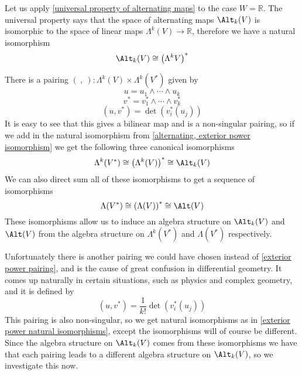 Let us apply \cref{universal property of alternating maps} to the case $W = \mathbb R$. The universal property says that the space of alternating maps $\Alt_k(V)$ is isomorphic to the space of linear maps $\Lambda^k(V) \rightarrow \mathbb R$, therefore we have a natural isomorphism
\begin{equation}
\label{alternating, exterior power isomorphism}
\Alt_k(V) \cong \left( \Lambda^k V \right)^*
\end{equation}

There is a pairing $(\ ,\ ) : \Lambda^k(V) \times \Lambda^k(V^*)$ given by
\[ u = u_1 \wedge \cdots \wedge u_k \]
\[ v^* = v_1^* \wedge \cdots \wedge v_k^* \]
\begin{equation}
\label{exterior power pairing}
(u,v^*) = \det(v_i^*(u_j))
\end{equation}
It is easy to see that this gives a bilinear map and is a non-singular pairing, so if we add in the natural isomorphism from \eqref{alternating, exterior power isomorphism} we get the following three canonical isomorphisms
\begin{equation}
\label{exterior power natural isomorphisms}
\Lambda^k(V^*) \cong \left( \Lambda^k(V) \right)^* \cong \Alt_k(V)
\end{equation}
We can also direct sum all of these isomorphisms to get a sequence of isomorphisms
\[ \Lambda(V^*) \cong \left( \Lambda(V) \right)^* \cong \Alt(V) \]
These isomorphisms allow us to induce an algebra structure on $\Alt_k(V)$ and $\Alt(V)$ from the algebra structure on $\Lambda^k(V^*)$ and $\Lambda(V^*)$ respectively.

Unfortunately there is another pairing we could have chosen instead of \eqref{exterior power pairing}, and is the cause of great confusion in differential geometry. It comes up naturally in certain situations, such as physics and complex geometry, and it is defined by
\begin{equation}
\label{other exterior power pairing}
(u,v^*) = \frac{1}{k!} \det(v_i^*(u_j))
\end{equation}
This pairing is also non-singular, so we get natural isomorphisms as in \eqref{exterior power natural isomorphisms}, except the isomorphisms will of course be different. Since the algebra structure on $\Alt_k(V)$ comes from these isomorphisms we have that each pairing leads to a different algebra structure on $\Alt_k(V)$, so we investigate this now.

